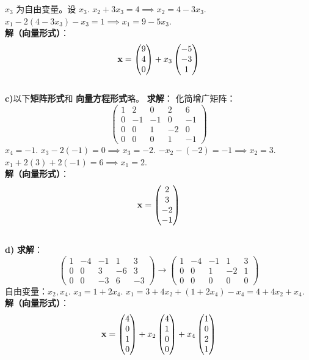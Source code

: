 \begin{exer}
$x_3$ 为自由变量。设 $x_3$.
$x_2 + 3x_3 = 4 \implies x_2 = 4 - 3x_3$.
$x_1 - 2(4 - 3x_3) - x_3 = 1 \implies x_1 = 9 - 5x_3$.
\\
\textbf{解（向量形式）}：
$$ \mathbf{x} = \begin{pmatrix} 9 \\ 4 \\ 0 \end{pmatrix} + x_3 \begin{pmatrix} -5 \\ -3 \\ 1 \end{pmatrix} $$
\\
\textbf{c)}以下\textbf{矩阵形式}和
\textbf{向量方程形式}略。
\textbf{求解}：
化简增广矩阵：
$$ \left(\begin{array}{cccc|c} 1 & 2 & 0 & 2 & 6 \\ 0 & -1 & -1 & 0 & -1 \\ 0 & 0 & 1 & -2 & 0 \\ 0 & 0 & 0 & 1 & -1 \end{array}\right) $$
$x_4 = -1$.
$x_3 - 2(-1) = 0 \implies x_3 = -2$.
$-x_2 - (-2) = -1 \implies x_2 = 3$.
$x_1 + 2(3) + 2(-1) = 6 \implies x_1 = 2$.
\\
\textbf{解（向量形式）}：
$$ \mathbf{x} = \begin{pmatrix} 2 \\ 3 \\ -2 \\ -1 \end{pmatrix} $$
\\
\textbf{d)}
\textbf{求解}：
$$ \left(\begin{array}{cccc|c} 1 & -4 & -1 & 1 & 3 \\ 0 & 0 & 3 & -6 & 3 \\ 0 & 0 & -3 & 6 & -3 \end{array}\right) \to \left(\begin{array}{cccc|c} 1 & -4 & -1 & 1 & 3 \\ 0 & 0 & 1 & -2 & 1 \\ 0 & 0 & 0 & 0 & 0 \end{array}\right) $$
自由变量：$x_2, x_4$.
$x_3 = 1 + 2x_4$.
$x_1 = 3 + 4x_2 + (1+2x_4) - x_4 = 4 + 4x_2 + x_4$.
\\
\textbf{解（向量形式）}：
$$ \mathbf{x} = \begin{pmatrix} 4 \\ 0 \\ 1 \\ 0 \end{pmatrix} + x_2 \begin{pmatrix} 4 \\ 1 \\ 0 \\ 0 \end{pmatrix} + x_4 \begin{pmatrix} 1 \\ 0 \\ 2 \\ 1 \end{pmatrix} $$

\end{exer}
